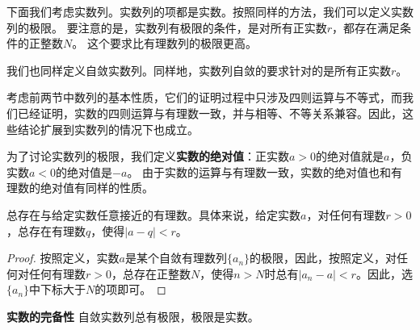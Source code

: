 \documentclass[12pt,UTF8]{ctexbook}
\begin{document}
\begin{appendix}
下面我们考虑实数列。实数列的项都是实数。按照同样的方法，我们可以定义实数列的极限。
要注意的是，实数列有极限的条件，是对所有正实数$r$，都存在满足条件的正整数$N$。
这个要求比有理数列的极限更高。

我们也同样定义自敛实数列。同样地，实数列自敛的要求针对的是所有正实数$r$。

考虑前两节中数列的基本性质，它们的证明过程中只涉及四则运算与不等式，而我们已经证明，实数的四则运算与有理数一致，并与相等、不等关系兼容。因此，这些结论扩展到实数列的情况下也成立。

为了讨论实数列的极限，我们定义\textbf{实数的绝对值}：正实数$a>0$的绝对值就是$a$，负实数$a<0$的绝对值是$-a$。
由于实数的运算与有理数一致，实数的绝对值也和有理数的绝对值有同样的性质。

\begin{tm}\label{tm:a-1-35}
    总存在与给定实数任意接近的有理数。具体来说，给定实数$a$，对任何有理数$r>0$，总存在有理数$q$，使得$|a - q| < r$。
\end{tm}
\begin{proof}
    按照定义，实数$a$是某个自敛有理数列$\{a_n\}$的极限，因此，按照定义，对任何对任何有理数$r>0$，总存在正整数$N$，使得$n>N$时总有$|a_n - a| < r$。因此，选$\{a_n\}$中下标大于$N$的项即可。
\end{proof}

\begin{tm}\textbf{实数的完备性}\label{tm:a-1-40}
    自敛实数列总有极限，极限是实数。
\end{tm}


\end{appendix}
\end{document}
